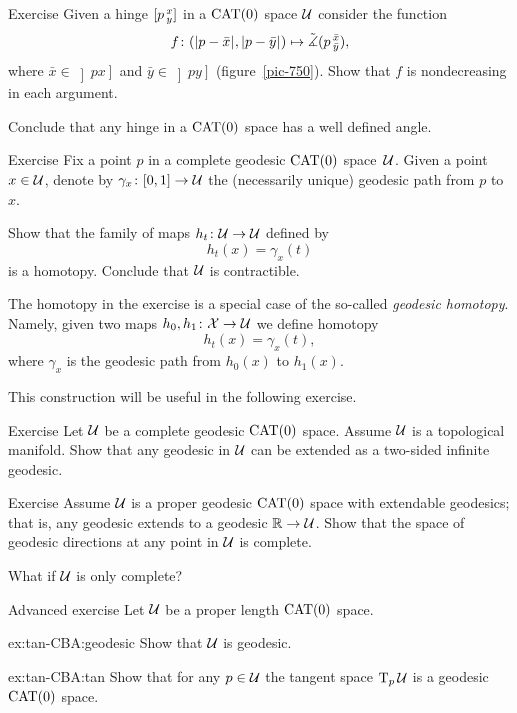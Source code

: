 \begin{thm}[!]{Exercise}\label{ex:noncreasing-CAT}
Given a hinge $[p\,{}^{x}_{y}]$ in a $\mathrm{CAT}(0)$ space $\mathcal{U}$ consider the function 
\[f\:(\dist{p}{\bar x}{},\dist{p}{\bar y}{})\mapsto \angk p{\bar x}{\bar y},\]
where $\bar x\in\left]p x\right]$ and $\bar y\in\left]p y\right]$ (figure~\ref{pic-750}).
Show that $f$ is nondecreasing in each argument.

Conclude that any hinge in a $\mathrm{CAT}(0)$ space has a well  defined angle.
\end{thm}

\begin{thm}[!]{Exercise}\label{ex:contractible}
Fix a point $p$ in a complete geodesic $\mathrm{CAT}(0)$ space~$\mathcal{U}$.
Given a point $x\in \mathcal{U}$, denote by $\gamma_x\colon[0,1]\to \mathcal{U}$ the (necessarily unique) geodesic path from $p$ to $x$.

Show that the family of maps $h_t\colon \mathcal{U}\to \mathcal{U}$ defined by 
\[h_t(x)= \gamma_x(t)\]
is a homotopy.
Conclude that $\mathcal{U}$ is contractible.
\end{thm}

The homotopy in the exercise is a special case of the so-called \emph{geodesic homotopy}.
Namely, given two maps $h_0,h_1\colon\mathcal{X}\to \mathcal{U}$ we define homotopy
\[h_t(x)= \gamma_x(t),\]
where $\gamma_x$ is the geodesic path from $h_0(x)$ to $h_1(x)$.

This construction will be useful in the following exercise.

\begin{thm}{Exercise}\label{ex:CAT-mnfld=>ext.geod}
Let $\mathcal{U}$ be a complete geodesic $\mathrm{CAT}(0)$ space.
Assume $\mathcal{U}$ is a topological manifold.
Show that any geodesic in $\mathcal{U}$ can be extended 
as a two-sided infinite geodesic.
\end{thm}

\begin{thm}{Exercise}\label{ex:geod-CBA}
Assume $\mathcal{U}$ is a proper geodesic $\mathrm{CAT}(0)$ space
 with extendable geodesics;
that is,
any geodesic extends to a geodesic $\mathbb{R}\to \mathcal{U}$.
Show that the space of geodesic directions at any point in $\mathcal{U}$ is complete.

What if $\mathcal{U}$ is only complete?
\end{thm}

\begin{thm}{Advanced exercise}\label{ex:tan-CBA}
Let $\mathcal{U}$ be a proper length $\mathrm{CAT}(0)$ space.

\begin{subthm}{ex:tan-CBA:geodesic}
Show that $\mathcal{U}$ is geodesic.
\end{subthm}

\begin{subthm}{ex:tan-CBA:tan}
Show that for any $p\in\mathcal{U}$ the tangent space $\mathrm{T}_p\,\mathcal{U}$ is a geodesic $\mathrm{CAT}(0)$ space.
\end{subthm}

\end{thm}


